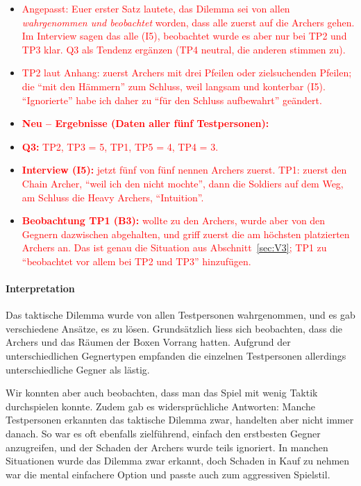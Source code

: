 \documentclass[../Main.tex]{subfiles}
\begin{document}
\begin{itemize}[leftmargin=1.5cm]
    \item \textcolor{red}{Angepasst: Euer erster Satz lautete, das Dilemma sei von allen \emph{wahrgenommen und beobachtet} worden, dass alle zuerst auf die Archers gehen. Im Interview sagen das alle (I5), beobachtet wurde es aber nur bei TP2 und TP3 klar. Q3 als Tendenz ergänzen (TP4 neutral, die anderen stimmen zu).}
    \item \textcolor{red}{TP2 laut Anhang: zuerst Archers mit drei Pfeilen oder zielsuchenden Pfeilen; die \enquote{mit den Hämmern} zum Schluss, weil langsam und konterbar (I5). \enquote{Ignorierte} habe ich daher zu \enquote{für den Schluss aufbewahrt} geändert.}
\end{itemize}

\begin{itemize}[leftmargin=1.5cm]
    \item \textcolor{red}{\textbf{Neu -- Ergebnisse (Daten aller fünf Testpersonen):}}
    \item \textcolor{red}{\textbf{Q3:} TP2, TP3 = 5, TP1, TP5 = 4, TP4 = 3.}
    \item \textcolor{red}{\textbf{Interview (I5):} jetzt fünf von fünf nennen Archers zuerst. TP1: zuerst den Chain Archer, \enquote{weil ich den nicht mochte}, dann die Soldiers auf dem Weg, am Schluss die Heavy Archers, \enquote{Intuition}.}
    \item \textcolor{red}{\textbf{Beobachtung TP1 (B3):} wollte zu den Archers, wurde aber von den Gegnern dazwischen abgehalten, und griff zuerst die am höchsten platzierten Archers an. Das ist genau die Situation aus Abschnitt~\ref{sec:V3}; TP1 zu \enquote{beobachtet vor allem bei TP2 und TP3} hinzufügen.}
\end{itemize}

\paragraph{Interpretation}
Das taktische Dilemma wurde von allen Testpersonen wahrgenommen, und es gab verschiedene Ansätze, es zu lösen. Grundsätzlich liess sich beobachten, dass die Archers und das Räumen der Boxen Vorrang hatten. Aufgrund der unterschiedlichen Gegnertypen empfanden die einzelnen Testpersonen allerdings unterschiedliche Gegner als lästig.

Wir konnten aber auch beobachten, dass man das Spiel mit wenig Taktik durchspielen konnte. Zudem gab es widersprüchliche Antworten: Manche Testpersonen erkannten das taktische Dilemma zwar, handelten aber nicht immer danach. So war es oft ebenfalls zielführend, einfach den erstbesten Gegner anzugreifen, und der Schaden der Archers wurde teils ignoriert. In manchen Situationen wurde das Dilemma zwar erkannt, doch Schaden in Kauf zu nehmen war die mental einfachere Option und passte auch zum aggressiven Spielstil.
\end{document}
